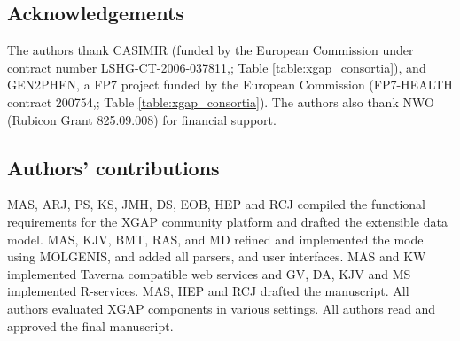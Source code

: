 \subsection*{Acknowledgements}
The authors thank CASIMIR (funded by the European Commission under contract number LSHG-CT-2006-037811,\cite{xgap_casimir}; Table \ref{table:xgap_consortia}), and GEN2PHEN, a FP7 project funded by the European Commission (FP7-HEALTH contract 200754,\cite{xgap_gen2phen}; Table \ref{table:xgap_consortia}).
The authors also thank NWO (Rubicon Grant 825.09.008) for financial support.

\subsection*{Authors’ contributions}
MAS, ARJ, PS, KS, JMH, DS, EOB, HEP and RCJ compiled the functional requirements for the XGAP community platform and drafted the extensible data model.
MAS, KJV, BMT, RAS, and MD refined and implemented the model using MOLGENIS, and added all parsers, and user interfaces.
MAS and KW implemented Taverna compatible web services and GV, DA, KJV and MS implemented R-services.
MAS, HEP and RCJ drafted the manuscript.
All authors evaluated XGAP components in various settings.
All authors read and approved the final manuscript.
